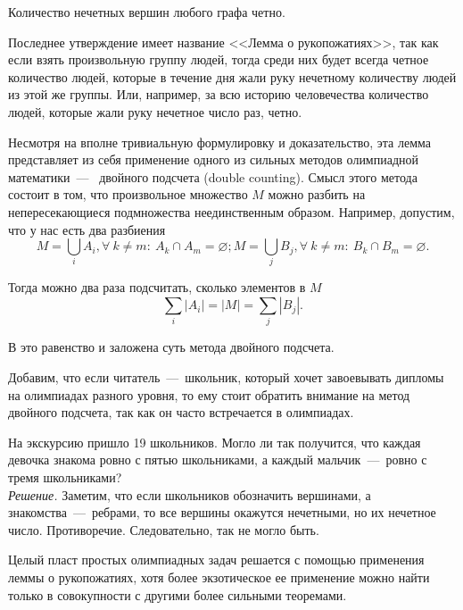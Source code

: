 \begin{consequence}
	Количество нечетных вершин любого графа четно.
\end{consequence}

	Последнее утверждение имеет название <<Лемма о рукопожатиях>>, так как если взять произвольную группу людей, тогда 
	среди них будет всегда четное количество людей, которые в течение дня жали руку нечетному количеству людей из этой же группы. 
	Или, например, за всю историю человечества количество людей, которые жали руку нечетное число раз, четно.

	Несмотря на вполне тривиальную формулировку и доказательство, эта лемма представляет из себя применение одного из сильных методов 
	олимпиадной математики~---~ двойного подсчета (double counting). Смысл этого метода состоит в том, что произвольное множество $M$ 
	можно разбить на непересекающиеся подмножества неединственным образом. Например, допустим, что у нас есть два разбиения 
	$$M = \bigcup_i A_i, \forall \!\ k \neq m \colon \!\ A_k \cap A_m = \varnothing; 
	M = \bigcup_j B_j,  \forall \!\ k \neq m \colon \!\ B_k \cap B_m = \varnothing.$$

	Тогда можно два раза подсчитать, сколько элементов в $M$
	$$\sum_i |A_i| = |M| = \sum_j |B_j|.$$	
	
	В это равенство и заложена суть метода двойного подсчета.
	
	Добавим, что если читатель~---~школьник, который хочет завоевывать дипломы на олимпиадах разного уровня, 
	то ему стоит обратить внимание на метод двойного подсчета, так как он часто встречается в олимпиадах.
	
\begin{example}
	На экскурсию пришло 19 школьников. Могло ли так получится, что каждая девочка знакома ровно с пятью школьниками, 
	а каждый мальчик~---~ровно с тремя школьниками?\\
	
	\emph{Решение.} Заметим, что если школьников обозначить вершинами, а знакомства~---~ребрами, то все 
	вершины окажутся нечетными, но их нечетное число. Противоречие. Следовательно, так не могло быть.
\end{example}

	Целый пласт простых олимпиадных задач решается с помощью применения леммы о рукопожатиях, хотя более экзотическое 
	ее применение можно найти только в совокупности с другими более сильными теоремами. 


